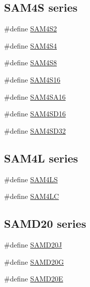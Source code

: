 \subsection*{S\+A\+M4S series}
\begin{DoxyCompactItemize}
\item 
\#define \mbox{\hyperlink{group__sam__part__macros__group_ga797a42a5eb0d374075a5cbf6b6b5318b}{S\+A\+M4\+S2}}
\item 
\#define \mbox{\hyperlink{group__sam__part__macros__group_ga9c0feae652dc37c207bd933f6db2d7f4}{S\+A\+M4\+S4}}
\item 
\#define \mbox{\hyperlink{group__sam__part__macros__group_ga04e32c037894a537ffb6193413693cb0}{S\+A\+M4\+S8}}
\item 
\#define \mbox{\hyperlink{group__sam__part__macros__group_ga1c3c5c80f2c2ca26604ff5d59cb3a0b2}{S\+A\+M4\+S16}}
\item 
\#define \mbox{\hyperlink{group__sam__part__macros__group_ga51a0ff030b5d9e555653a4227538a888}{S\+A\+M4\+S\+A16}}
\item 
\#define \mbox{\hyperlink{group__sam__part__macros__group_ga817106c645da5be09dd37af37d7fb805}{S\+A\+M4\+S\+D16}}
\item 
\#define \mbox{\hyperlink{group__sam__part__macros__group_gaddfc17b115c4d5b5ff8b14eb2b8d4a2a}{S\+A\+M4\+S\+D32}}
\end{DoxyCompactItemize}
\subsection*{S\+A\+M4L series}
\begin{DoxyCompactItemize}
\item 
\#define \mbox{\hyperlink{group__sam__part__macros__group_gafd288e34365d8a47cadf64f9040b97c6}{S\+A\+M4\+LS}}
\item 
\#define \mbox{\hyperlink{group__sam__part__macros__group_gaff053c1dc2a1aaf1e97428da4cb49704}{S\+A\+M4\+LC}}
\end{DoxyCompactItemize}
\subsection*{S\+A\+M\+D20 series}
\begin{DoxyCompactItemize}
\item 
\#define \mbox{\hyperlink{group__sam__part__macros__group_ga5f1a6d04b67f9e1eceb737aea3ece8c8}{S\+A\+M\+D20J}}
\item 
\#define \mbox{\hyperlink{group__sam__part__macros__group_ga98be0064016617a8ce1449905046f81a}{S\+A\+M\+D20G}}
\item 
\#define \mbox{\hyperlink{group__sam__part__macros__group_ga4540be1fa82a17932c6000a0919806b0}{S\+A\+M\+D20E}}
\end{DoxyCompactItemize}
